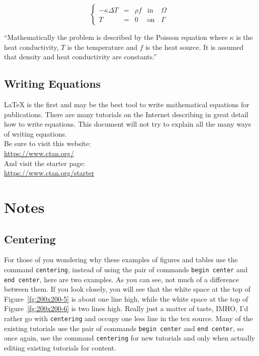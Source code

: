 \begin{figure}
\begin{equation}
\left \{
\begin{array}{ccccc}
- \kappa \Delta T &= &\rho f & \mathrm{ in } \, \, & \Omega \\
T&=&0 & \mathrm{ on } & \Gamma
\end{array}
\right .
\end{equation}
\end{figure}

``Mathematically the problem is described by the Poisson equation where $\kappa$ is the heat conductivity, $T$  is the temperature and $f$ is the heat source. It is assumed that density and heat conductivity are constants.''\\

\section{Writing Equations}

LaTeX is the first and may be the best tool to write mathematical equations for publications.  There are many tutorials on the Internet describing in great detail how to write equations.  This document will not try to explain all the many ways of writing equations.\\

Be sure to visit this website:\\

\url{https://www.ctan.org/}\\

And visit the starter page:\\

\url{https://www.ctan.org/starter}

\chapter{Notes}

\section{Centering}

For those of you wondering why these examples of figures and tables use the command \texttt{centering}, instead of using the pair of commands \texttt{begin center} and \texttt{end center}, here are two examples.  As you can see, not much of a difference between them.  If you look closely, you will see that the white space at the top of Figure~\ref{fg:200x200-5} is about one line high, while the white space at the top of Figure~\ref{fg:200x200-6} is two lines high.  Really just a matter of taste, IMHO, I'd rather go with \texttt{centering} and occupy one less line in the tex source.  Many of the existing tutorials use the pair of commands \texttt{begin center} and \texttt{end center}, so once again, use the command \texttt{centering} for new tutorials and only when actually editing existing tutorials for content.


